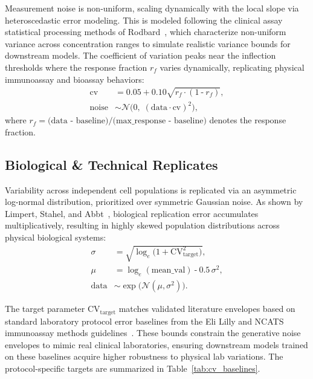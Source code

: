 \documentclass[11pt,twocolumn]{article}
\newcommand{\N}{\mathcal{N}}
\begin{document}
Measurement noise is non-uniform, scaling dynamically with the local slope via heteroscedastic error modeling. This is modeled following the clinical assay statistical processing methods of Rodbard~\cite{rodbard1974statistical}, which characterize non-uniform variance across concentration ranges to simulate realistic variance bounds for downstream models. The coefficient of variation peaks near the inflection thresholds where the response fraction $r_f$ varies dynamically, replicating physical immunoassay and bioassay behaviors:
\begin{align}
  \text{cv} &= 0.05 + 0.10\sqrt{r_f \cdot (1 \mathbin{\text{-}} r_f)}, \label{eq:cv}\\
  \text{noise} &\sim \N\!\bigl(0,\;(\text{data} \cdot \text{cv})^2\bigr), \label{eq:hill_noise}
\end{align}
where $r_f = \text{(data - baseline)/(max\_response - baseline)}$ denotes the response fraction.

\subsection{Biological \& Technical Replicates}\label{sec:replicates}

Variability across independent cell populations is replicated via an asymmetric log-normal distribution, prioritized over symmetric Gaussian noise. As shown by Limpert, Stahel, and Abbt~\cite{limpert2001lognormal}, biological replication error accumulates multiplicatively, resulting in highly skewed population distributions across physical biological systems:
\begin{align}
  \sigma &= \sqrt{\log_e\bigl(1 + \text{CV}_{\text{target}}^2\bigr)}, \label{eq:lognorm_sigma}\\
  \mu &= \log_e(\text{mean\_val}) \mathbin{\text{-}} 0.5\,\sigma^2, \label{eq:lognorm_mu}\\
  \text{data} &\sim \exp\bigl(\N(\mu, \sigma^2)\bigr). \label{eq:lognorm}
\end{align}

The target parameter $\text{CV}_{\text{target}}$ matches validated literature envelopes based on standard laboratory protocol error baselines from the Eli Lilly and NCATS immunoassay methods guidelines~\cite{lilly2012immunoassay}. These bounds constrain the generative noise envelopes to mimic real clinical laboratories, ensuring downstream models trained on these baselines acquire higher robustness to physical lab variations. The protocol-specific targets are summarized in Table~\ref{tab:cv_baselines}.
\end{document}
